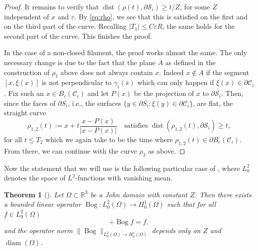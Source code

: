 \documentclass[11pt]{article}
\newcommand{\ie}{i.e.,\xspace}
\newcommand{\R}{\mathbb{R}}
\let\eps\varepsilon
\DeclareMathOperator{\Bog}{Bog}
\DeclareMathOperator{\diam}{diam}
\DeclareMathOperator{\dist}{dist}
\newtheorem{thm}{Theorem}[section]
\theoremstyle{definition}
\theoremstyle{remark}
\begin{document}
\begin{proof}
It remains to verify that $ \dist(\rho(t),\partial \mathcal S_i) \geq t/Z$, for some $Z$ independent of $x$ and $\eps$.
By \eqref{eq:rho}, we see that this is satisfied on the first and on the third part of the curve. Recalling $|T_1| \leq C \eps R$, the same holds for the second part of the curve. This finishes the proof.

In the case of a non-closed filament, the proof works almost the same. The only necessary change is due to the fact that the plane $A$ as defined in the construction of $\rho_1$ above does not always contain $x$. Indeed $x \not \in A$ if the segment $[x,\xi(x)]$ is not perpendicular to $\gamma_i (\bar s)$ which can only happen if $\xi (x) \in \partial \mathcal C_i$. Fix such an $x \in B_c(\mathcal C_i)$ and let $P(x)$ be the projection of $x$ to $\partial \mathcal S_i$. Then, since the faces of $\partial S_i$, \ie the surfaces $\{y \in \partial S_i : \xi(y) \in \partial \mathcal C_i\}$, are flat, the straight curve
\begin{equation}
\rho_{1,2}(t):= x + t \frac{x - P(x)}{|x - P(x)|}
\quad\text{satisfies }
\dist(\rho_{1,2}(t), \partial \mathcal S_i) \geq t,
\end{equation}
for all $t \leq T_2$ which we again take to be the time where $\rho_{1,2}(t) \in \partial B_c(\mathcal C_i)$. From there, we can continue with the curve $\rho_3$ as above.
\end{proof}

Now the statement that we will use is the following particular case of {\cite[Th.\,4.1]{AcostaDuranMuschietti06}}, where
$L^2_0$ denotes the space of $L^2$-functions with vanishing mean.
\begin{thm}[{\cite[Th.\,4.1]{AcostaDuranMuschietti06}}] \label{John}
Let $\Omega \subset \R^3$ be a John domain with constant $Z$. Then there exists a bounded linear operator
$\Bog \colon L^2_0(\Omega)\!\to\!H^{1}_0(\Omega)$
such that for all \hbox{$f \!\in\!L^2_0(\Omega)$}%
\begin{equation}
\div \Bog f = f,
\end{equation}
and the operator norm
$\|\Bog\|_{L^2_0(\Omega) \to H^{1}_0(\Omega)}$ depends only on $Z$ and $\diam(\Omega)$.
\end{thm}
\end{document}
